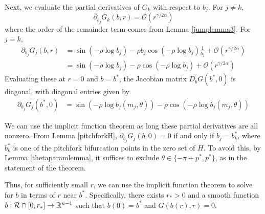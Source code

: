 \documentclass[thesis.tex]{subfiles}
\begin{document}
Next, we evaluate the partial derivatives of $G_k$ with respect to $b_j$. For $j \neq k$, 
\[
\partial_{b_j} G_k(b, r) = \mathcal{O}(r^{\gamma/2\alpha})
\]
where the order of the remainder term comes from Lemma \ref{jumplemma3}. For $j = k$, 
\begin{align*}
\partial_{b_j} G_j(b, r) &= 
\sin \left( -\rho \log b_j \right) - \rho b_j \cos \left( -\rho \log b_j \right) \frac{1}{b_j} + \mathcal{O}(r^{\gamma/2\alpha}) \\
&= \sin \left( -\rho \log b_j \right) - \rho \cos \left( -\rho \log b_j \right) + \mathcal{O}(r^{\gamma/2\alpha}) 
\end{align*}
Evaluating these at $r = 0$ and $b = b^*$, the Jacobian matrix $D_b G(b^*,0)$ is diagonal, with diagonal entries given by 
\begin{align*}
\partial_{b_j} G_j(b^*, 0)
&= \sin \left( -\rho \log b_j(m_j, \theta) \right) - \rho \cos \left( -\rho \log b_j(m_j, \theta) \right)
\end{align*}

We can use the implicit function theorem as long these partial derivatives are all nonzero. From Lemma \ref{pitchforkH}, $\partial_{b_j} G_j(b, 0) = 0$ if and only if $b_j = b_k^*$, where $b_k^*$ is one of the pitchfork bifurcation points in the zero set of $H$. To avoid this, by Lemma \ref{thetaparamlemma}, it suffices to exclude $\theta \in \{ -\pi + p^*, p^* \}$, as in the statement of the theorem.

Thus, for sufficiently small $r$, we can use the implicit function theorem to solve for $b$ in terms of $r$ near $b^*$. Specifically, there exists $r_* > 0$ and a smooth function $b: \mathcal{R} \cap [0, r_*] \rightarrow \mathbb{R}^{n-1}$ such that $b(0) = b^*$ and $G(b(r),r) = 0$. 
\end{document}
